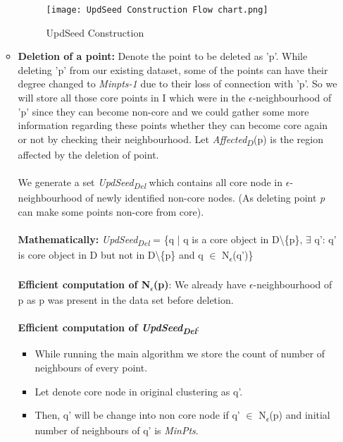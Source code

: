 \documentclass[acmsmall]{acmart}
\begin{document}
\begin{enumerate}
\begin{itemize}
        \begin{figure}[!h]
            \centering
            \texttt{[image: UpdSeed Construction Flow chart.png]}
            \caption{UpdSeed Construction}
            \label{fig:my_label}
        \end{figure}
        
        \item \textbf{Deletion of a point:} Denote the point to be deleted as 'p'. While deleting 'p' from our existing dataset, some of the points can have their degree changed to \textit{Minpts-1} due to their loss of connection with 'p'. So we will store all those core points in I which were in the $\epsilon$-neighbourhood of 'p' since they can become non-core and we could gather some more information regarding these points whether they can become core again or not by checking their neighbourhood. \newline
        Let \textit{Affected}\textsubscript{$D$}(p) is the region affected by the deletion of point. \\ \\
        We generate a set \textit{UpdSeed\textsubscript{Del}} which contains all core node in $\epsilon$-neighbourhood of newly identified non-core nodes. (As deleting point \textit{p} can make some points non-core from core).\\ \\ \textbf{Mathematically:} \textit{UpdSeed\textsubscript{Del}} = \{q | q is a core object in D\textbackslash \{p\}, $\exists$ q’: q’ is core object in D but not in D\textbackslash \{p\} and q $\in$ N\textsubscript{$\epsilon$}(q')\} \\ \\
        \textbf{Efficient computation of N\textsubscript{$\epsilon$}(p)}:
        We already have $\epsilon$-neighbourhood of p as p was present in the data set before deletion.\\ \\
        \textbf{Efficient computation of \textit{UpdSeed\textsubscript{Del}}}:
        \begin{itemize}
            \item While running the main algorithm we store the count of number of neighbours of every point.
            \item Let denote core node in original clustering as q'.
            \item Then, q' will be change into non core node if q' $\in$ N\textsubscript{$\epsilon$}(p) and initial number of neighbours of  q' is \textit{MinPts}.

\end{itemize}
\end{itemize}
\end{enumerate}
\end{document}
